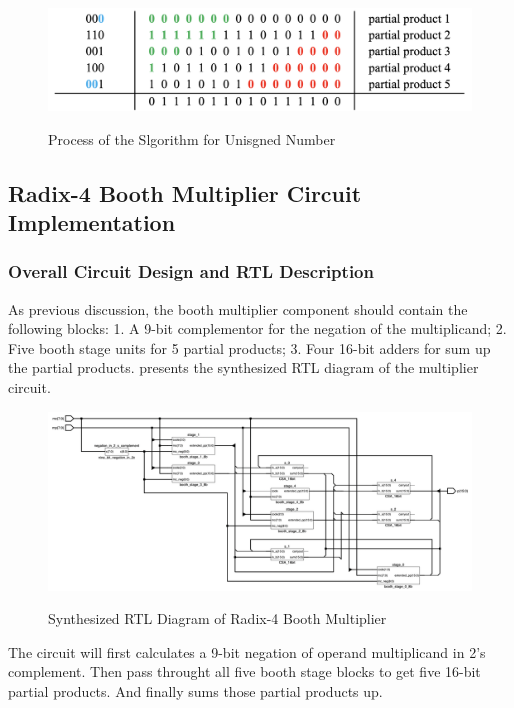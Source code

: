 \begin{figure}[!ht]
	\centering
	\caption{Process of the Slgorithm for Unisgned Number}
	\includegraphics[width=5.7in]{../img/r4b_process_2.png}
	\label{fig:r4b_process_2}
\end{figure}

\subsection{Radix-4 Booth Multiplier Circuit Implementation}
\subsubsection{Overall Circuit Design and RTL Description}

As previous discussion, the booth multiplier component should contain the following blocks: 1.
A 9-bit complementor for the negation of the multiplicand;
2. Five booth stage units for 5 partial products;
3. Four 16-bit adders for sum up the partial products.
 presents the synthesized RTL diagram of the multiplier circuit.

\begin{figure}[!ht]
	\centering
	\caption{Synthesized RTL Diagram of Radix-4 Booth Multiplier}
	\includegraphics[width=\textwidth]{../img/overview_booth_rtl.png}
	\label{fig:overview_booth_rtl}
\end{figure}

The circuit will first calculates a 9-bit negation of operand multiplicand in 2's complement.
Then pass throught all five booth stage blocks to get five 16-bit partial products. And finally sums those partial products up.

